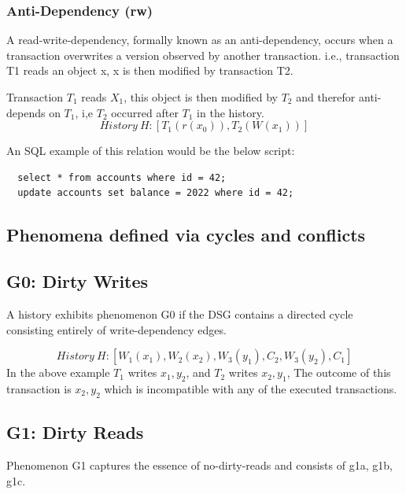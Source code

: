 \documentclass[a4paper,10pt,titlepage]{report}
\begin{document}
\subsubsection{Anti-Dependency (rw)}
A read-write-dependency, formally known as an anti-dependency, occurs when a transaction overwrites a version observed by another transaction. i.e., transaction T1 reads an object x, x is then modified by transaction T2.

\vspace{2mm}

\vspace{2mm}



Transaction $T_1$ reads $X_1$, this object is then modified by $T_2$ and therefor anti-depends on $T_1$, i,e $T_2$ occurred after $T_1$ in the history.
\begin{equation}
    History\ H: [T_1(r(x_0)), T_2(W(x_1))]
\end{equation}


An SQL example of this relation would be the below script:
\begin{lstlisting}
  select * from accounts where id = 42;
  update accounts set balance = 2022 where id = 42;
\end{lstlisting}

\subsection{Phenomena defined via cycles and conflicts}

\subsection{G0: Dirty Writes}
A history exhibits phenomenon G0 if the DSG contains a directed cycle consisting entirely of write-dependency edges.



\begin{equation}
    History\ H: [W_1(x_1),W_2(x_2),W_3(y_1),C_2,W_3(y_2),C_1]
\end{equation}
In the above example $T_1$ writes $x_1, y_2$, and $T_2$ writes $x_2, y_1$, The outcome of this transaction is $x_2, y_2$ which is incompatible with any of the executed transactions.

\subsection{G1: Dirty Reads}
Phenomenon G1 captures the essence of no-dirty-reads and consists of g1a, g1b, g1c.
\end{document}
